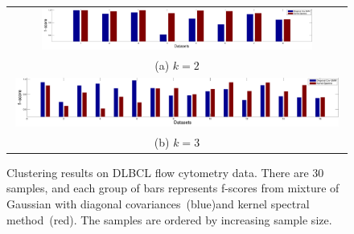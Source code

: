 \begin{figure}
  \centering
	\begin{tabular}{c}
		\includegraphics[width=0.82\textwidth]{../experiment/figure/paired_bar_chat_k_2} \\
		(a) $k=2$ \\
		\includegraphics[width=0.98\textwidth]{../experiment/figure/paired_bar_chat_k_3}  \\
		(b) $k=3$
	\end{tabular}
  \vspace{-3mm}
  \caption{Clustering results on DLBCL flow cytometry data. There are 30 samples, and each group of bars represents f-scores from mixture of Gaussian with diagonal covariances~(blue)and kernel spectral method~(red). The samples are ordered by increasing sample size.}\label{fig:real_data}
  \vspace{-3mm}
\end{figure}
